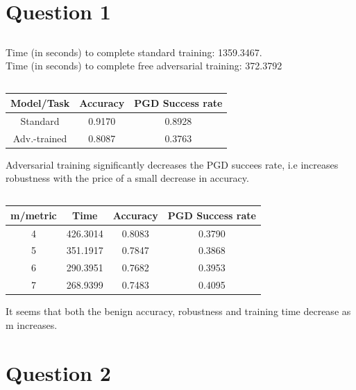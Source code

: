 \documentclass{article}
\begin{document}
\section{Question 1}
\setcounter{subsection}{2}
\subsection{}
Time (in seconds) to complete standard training: 1359.3467. \\
Time (in seconds) to complete free adversarial training: 372.3792
\subsection{}
\begin{center}
\begin{tabular}{||c c c||} 
    \hline
    Model/Task & Accuracy & PGD Success rate \\ [0.5ex] 
    \hline\hline
    Standard & 0.9170 & 0.8928 \\ 
    \hline
    Adv.-trained & 0.8087 & 0.3763 \\
    \hline 
\end{tabular}
\end{center}
Adversarial training significantly decreases the PGD succees rate, i.e increases robustness with the price of a small decrease in accuracy.
\subsection{}
\begin{center}
\begin{tabular}{||c c c c||} 
    \hline
    m/metric & Time & Accuracy & PGD Success rate \\ [0.5ex] 
    \hline\hline
    4 & 426.3014 & 0.8083 & 0.3790 \\ 
    \hline
    5 & 351.1917 & 0.7847 & 0.3868 \\
    \hline
    6 & 290.3951 & 0.7682 & 0.3953 \\
    \hline
    7 & 268.9399 & 0.7483 & 0.4095 \\
    \hline 
\end{tabular}
\end{center}
It seems that both the benign accuracy, robustness and training time decrease as m increases.
\section{Question 2}
\setcounter{subsection}{1}
\end{document}
